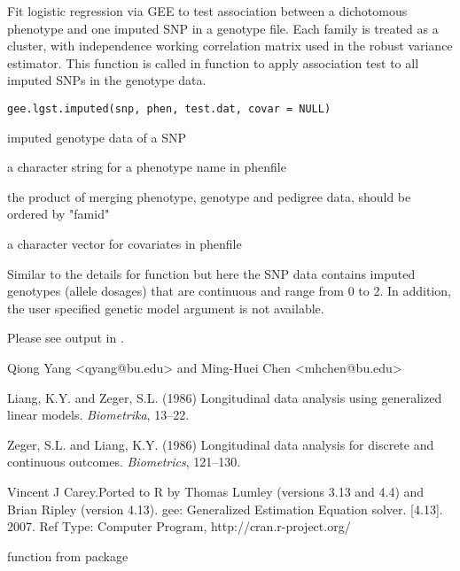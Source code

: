\begin{Description}\relax
Fit logistic regression via GEE to test association between a dichotomous phenotype 
and one imputed SNP in a genotype file. Each family is treated as 
a cluster, with independence working correlation matrix used in the robust variance estimator.
This function is called in  function to apply association test to all imputed SNPs in the 
genotype data.
\end{Description}
\begin{Usage}
\begin{verbatim}
gee.lgst.imputed(snp, phen, test.dat, covar = NULL)
\end{verbatim}
\end{Usage}
\begin{Arguments}
\begin{ldescription}
\item[\code{snp}] imputed genotype data of a SNP
\item[\code{phen}] a character string for a phenotype name in phenfile 
\item[\code{test.dat}] the product of merging phenotype, genotype and pedigree data, should be ordered by "famid" 
\item[\code{covar}] a character vector for covariates in phenfile 
\end{ldescription}
\end{Arguments}
\begin{Details}\relax
Similar to the details for  function but here the SNP data contains imputed genotypes (allele dosages) 
that are continuous and range from 0 to 2. In addition, the user specified genetic model argument is not available.
\end{Details}
\begin{Value}
Please see output in .
\end{Value}
\begin{Author}\relax
Qiong Yang <qyang@bu.edu> and Ming-Huei Chen <mhchen@bu.edu>
\end{Author}
\begin{References}\relax
Liang, K.Y. and Zeger, S.L. (1986)
Longitudinal data analysis using generalized linear models.
\emph{Biometrika},  13--22. 

Zeger, S.L. and Liang, K.Y. (1986)
Longitudinal data analysis for discrete and continuous outcomes.
\emph{Biometrics},  121--130.

Vincent J Carey.Ported to R by Thomas Lumley (versions 3.13 and 4.4) and Brian Ripley (version 4.13). gee: Generalized Estimation Equation solver. 
[4.13]. 2007. Ref Type: Computer Program, http://cran.r-project.org/
\end{References}
\begin{SeeAlso}\relax
{} function from package 
\end{SeeAlso}

